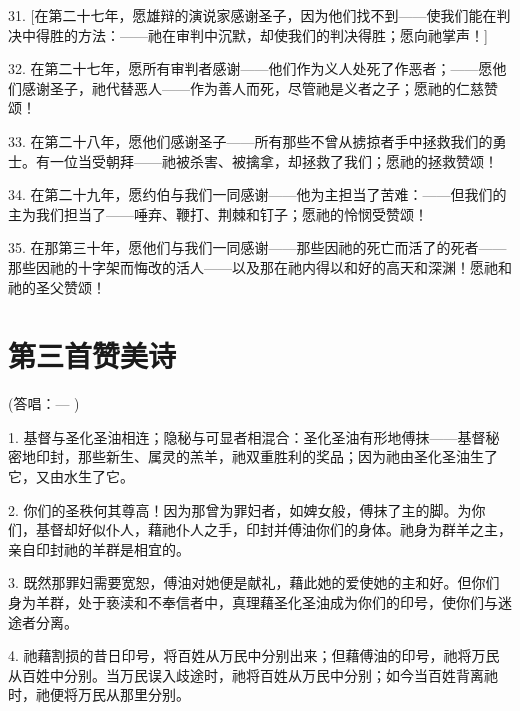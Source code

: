 31. [在第二十七年，愿雄辩的演说家感谢圣子，因为他们找不到——使我们能在判决中得胜的方法：——祂在审判中沉默，却使我们的判决得胜；愿向祂掌声！]\par

32. 在第二十七年，愿所有审判者感谢——他们作为义人处死了作恶者；——愿他们感谢圣子，祂代替恶人——作为善人而死，尽管祂是义者之子；愿祂的仁慈赞颂！\par

33. 在第二十八年，愿他们感谢圣子——所有那些不曾从掳掠者手中拯救我们的勇士。有一位当受朝拜——祂被杀害、被擒拿，却拯救了我们；愿祂的拯救赞颂！\par

34. 在第二十九年，愿约伯与我们一同感谢——他为主担当了苦难：——但我们的主为我们担当了——唾弃、鞭打、荆棘和钉子；愿祂的怜悯受赞颂！\par

35. 在那第三十年，愿他们与我们一同感谢——那些因祂的死亡而活了的死者——那些因祂的十字架而悔改的活人——以及那在祂内得以和好的高天和深渊！愿祂和祂的圣父赞颂！\par


\section{第三首赞美诗}

(答唱：— )\par

1. 基督与圣化圣油相连；隐秘与可显者相混合：圣化圣油有形地傅抹——基督秘密地印封，那些新生、属灵的羔羊，祂双重胜利的奖品；因为祂由圣化圣油生了它，又由水生了它。\par

2. 你们的圣秩何其尊高！因为那曾为罪妇者，如婢女般，傅抹了主的脚。为你们，基督却好似仆人，藉祂仆人之手，印封并傅油你们的身体。祂身为群羊之主，亲自印封祂的羊群是相宜的。\par

3. 既然那罪妇需要宽恕，傅油对她便是献礼，藉此她的爱使她的主和好。但你们身为羊群，处于亵渎和不奉信者中，真理藉圣化圣油成为你们的印号，使你们与迷途者分离。\par

4. 祂藉割损的昔日印号，将百姓从万民中分别出来；但藉傅油的印号，祂将万民从百姓中分别。当万民误入歧途时，祂将百姓从万民中分别；如今当百姓背离祂时，祂便将万民从那里分别。\par

